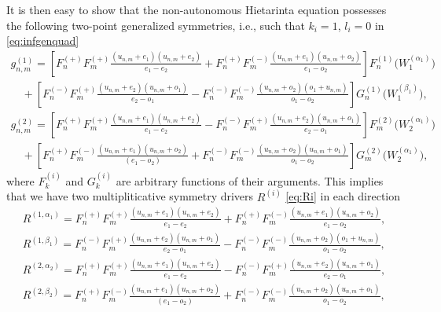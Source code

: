 \documentclass[pdftex]{sigma}
\numberwithin{equation}{section}
\newcommand{\Fp}[1]{F^{(+)}_{#1}}
\newcommand{\Fm}[1]{F^{(-)}_{#1}}
\newcommand{\Fppp}{\Fp{n}\Fp{m}}
\newcommand{\Fpmm}{\Fp{n}\Fm{m}}
\newcommand{\Fmpm}{\Fm{n}\Fp{m}}
\newcommand{\Fmmp}{\Fm{n}\Fm{m}}
\begin{document}
It is then easy to show that the non-autonomous Hietarinta equation possesses the following two-point generalized symmetries, i.e., such that $k_{i}=1$, $l_{i}=0$ in \eqref{eq:infgenquad}
 \begin{gather*}
 g^{(1)}_{n,m} =
 \left[
 \Fppp{\frac { ( u_{{n,m}}+{ e_1} )
 ( u_{{n,m}}+{ e_2}) }{ { e_1}-{ e_2} }}
 +\Fpmm
 {\frac { ( u_{{n,m}}+{ e_1} ) ( u_{{n,m}}+{ o_2} )}{ { e_1}-{ o_2} }}
 \right]\!
 {F}^{(1)}_{{n}} \big( W_{1}^{(\alpha_{1})} \big)\nonumber \\
 \quad{}+\left[\Fmpm{\frac { ( u_{{n,m}} + { e_2} ) ( u_{{n,m}} + {o_1} )}{
 { e_2}-{ o_1} }}
 - \Fmmp{\frac { ( u_{{n,m}} + { o_2} )
 ( { o_1} + u_{{n,m}} ) }{{o_1} -{o_2}}}\right]
 { G}_{{n}}^{(1)} \big( W_{1}^{(\beta_{1})} \big),      \label{j1nagsn} \\
 g^{(2)}_{n,m} =\left[
 {\Fppp\frac { ( u_{{n,m}}+{ e_1} ) ( u_{{n,m}}+{ e_2} )}{
 { e_1}-{ e_2} }}
 -\Fmpm{\frac { ( u_{{n,m}}+{ e_2} )
 ( u_{{n,m}} +{ o_1}) }{
 { e_2}-{ o_1} }}\right]\!
 { F}_{{m}}^{(2)} \big( W_{2}^{(\alpha_{1})} \big)\nonumber \\
  \quad{}+\left[\Fpmm{\frac { ( u_{{n,m}} + { e_1})
 ( u_{{n,m}} + { o_2} )}{ ( { e_1}-{ o_2} )}}
 + \Fmmp{\frac { ( u_{{n,m}} + { o_2} )
 ( u_{{n,m}} + { o_1} )}{ { o_1} -{ o_2}}}\right]
 { G}_{{m}}^{(2)} \big( W_{2}^{(\alpha_{1})} \big),      \label{j1nagsm}
 \end{gather*}
where $F^{(i)}_{k}$ and $G_{k}^{(i)}$ are arbitrary functions of their arguments. This implies that we have two multipliticative symmetry drivers $R^{(i)}$ \eqref{eq:Ri} in each direction
 \begin{gather*}
 R^{(1,\alpha_{1})} = \Fppp{\frac { ( u_{{n,m}}+{ e_1} ) ( u_{{n,m}}+{ e_2}) }{ { e_1}-{ e_2} }} +\Fpmm
 {\frac { ( u_{{n,m}}+{ e_1} ) ( u_{{n,m}}+{ o_2} )}{ { e_1}-{ o_2} }}, \label{j1naR1a} \\
 R^{(1,\beta_{1})}= \Fmpm{\frac { ( u_{{n,m}}+{ e_2} ) ( u_{{n,m}}+{o_1} )}{ { e_2}-{ o_1} }} -\Fmmp{\frac { ( u_{{n,m}}+{ o_2} ) ( { o_1}+u_{{n,m}} ) }{{o_1} -{o_2}}}, \label{j1naR1b} \\
 R^{(2,\alpha_{2})} = {\Fppp\frac { ( u_{{n,m}}+{ e_1} ) ( u_{{n,m}}+{ e_2} )}{ { e_1}-{ e_2} }} -\Fmpm{\frac { ( u_{{n,m}}+{ e_2} ) ( u_{{n,m}} +{ o_1}) }{ { e_2}-{ o_1} }}, \label{j1naR2a} \\
 R^{(2,\beta_{2})} =\Fpmm{\frac { ( u_{{n,m}}+{ e_1}) ( u_{{n,m}}+{ o_2} )}{ ( { e_1}-{ o_2} )}} +\Fmmp{\frac { ( u_{{n,m}}+{ o_2} )
 ( u_{{n,m}}+{ o_1} )}{ { o_1} -{ o_2}}}, \label{j1naR2b}
 \end{gather*}
\end{document}
